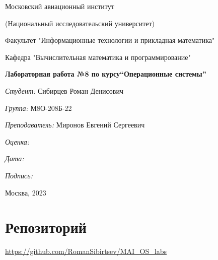 \documentclass[a4paper, 12pt]{article}
\begin{document}
\thispagestyle{empty}	
\begin{center}
	Московский авиационный институт
	
	(Национальный исследовательский университет)
	
	Факультет "Информационные технологии и прикладная математика"
	
	Кафедра "Вычислительная математика и программирование"
	
\end{center}
\vspace{40ex}
\begin{center}
	\textbf{\large{Лабораторная работа №8 по курсу\linebreak \textquotedblleft Операционные системы\textquotedblright}}
\end{center}
\vspace{35ex}
\begin{flushright}
	\textit{Студент: } Сибирцев Роман Денисович
	
	\vspace{2ex}
	\textit{Группа: } М8О-208Б-22
	
	\vspace{2ex}
	\textit{Преподаватель: } Миронов Евгений Сергеевич
	
	\vspace{2ex}
	\textit{Оценка: } \underline{\quad\quad\quad\quad\quad\quad}
	
	 \vspace{2ex}
	\textit{Дата: } \underline{\quad\quad\quad\quad\quad\quad}
	
	\vspace{2ex}
	\textit{Подпись: } \underline{\quad\quad\quad\quad\quad\quad}
	
\end{flushright}

\vspace{5ex}

\begin{vfill}
	\begin{center}
		Москва, 2023
	\end{center}	
\end{vfill}
\newpage


\begingroup
\color{black}
\tableofcontents\newpage
\endgroup

\section{Репозиторий}
\href{https://github.com/RomanSibirtsev/MAI\_OS\_labs}{https://github.com/RomanSibirtsev/MAI\_OS\_labs}
\end{document}
